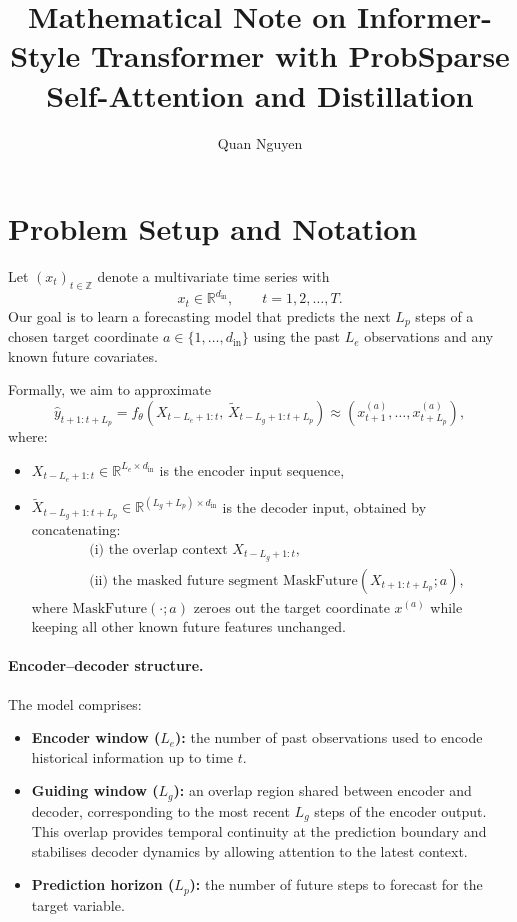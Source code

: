 \documentclass[11pt]{article}
\title{\textbf{Mathematical Note on Informer-Style Transformer with ProbSparse Self-Attention and Distillation}}
\author{Quan Nguyen}
\date{}
\begin{document}
\maketitle

\tableofcontents
\vspace{1em}

\section{Problem Setup and Notation}

Let $(x_t)_{t \in \mathbb{Z}}$ denote a multivariate time series with
\[
x_t \in \mathbb{R}^{d_{\text{in}}}, \qquad t = 1, 2, \ldots, T.
\]
Our goal is to learn a forecasting model that predicts the next $L_p$ steps
of a chosen target coordinate $a \in \{1, \ldots, d_{\text{in}}\}$ using the past $L_e$ observations and any known future covariates.

Formally, we aim to approximate
\[
\hat{y}_{t+1:t+L_p}
= f_{\theta}\!\left(
X_{t-L_e+1:t},\,
\tilde{X}_{t-L_g+1:t+L_p}
\right)
\approx (x^{(a)}_{t+1}, \ldots, x^{(a)}_{t+L_p}),
\]
where:
\begin{itemize}
    \item $X_{t-L_e+1:t} \in \mathbb{R}^{L_e \times d_{\text{in}}}$ is the encoder input sequence,
    \item $\tilde{X}_{t-L_g+1:t+L_p} \in \mathbb{R}^{(L_g + L_p) \times d_{\text{in}}}$ is the decoder input, obtained by concatenating:
    \begin{align*}
        &\text{(i) the overlap context } X_{t-L_g+1:t}, \\
        &\text{(ii) the masked future segment } \mathrm{MaskFuture}(X_{t+1:t+L_p}; a),
    \end{align*}
    where $\mathrm{MaskFuture}(\cdot; a)$ zeroes out the target coordinate $x^{(a)}$ while keeping all other known future features unchanged.
\end{itemize}

\paragraph{Encoder--decoder structure.}
The model comprises:
\begin{itemize}
    \item \textbf{Encoder window ($L_e$):} the number of past observations used to encode historical information up to time $t$.
    \item \textbf{Guiding window ($L_g$):} an overlap region shared between encoder and decoder, corresponding to the most recent $L_g$ steps of the encoder output. This overlap provides temporal continuity at the prediction boundary and stabilises decoder dynamics by allowing attention to the latest context.
    \item \textbf{Prediction horizon ($L_p$):} the number of future steps to forecast for the target variable.
\end{itemize}
\end{document}
